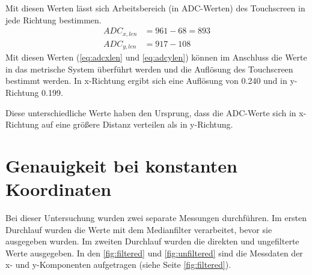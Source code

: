 Mit diesen Werten lässt sich Arbeitsbereich (in ADC-Werten) des Touchscreen in jede Richtung bestimmen.
\begin{align}
    ADC_{x,len} &= 961 - 68 = 893
    \label{eq:adcxlen}\\
    ADC_{y,len} &= 917 - 108
    \label{eq:adcylen}
\end{align}
Mit diesen Werten (\cref{eq:adcxlen} und \cref{eq:adcylen}) können im Anschluss die Werte in das metrische System überführt werden und die Auflösung des Touchscreen bestimmt werden.
In x-Richtung ergibt sich eine Auflösung von \SI{0,240}{} und in y-Richtung \SI{0,199}{}.

Diese unterschiedliche Werte haben den Ursprung, dass die ADC-Werte sich in x-Richtung auf eine größere Distanz verteilen als in y-Richtung.

\section{Genauigkeit bei konstanten Koordinaten}
\label{ab:genau}
Bei dieser Untersuchung wurden zwei separate Messungen durchführen.
Im ersten Durchlauf wurden die Werte mit dem Medianfilter verarbeitet, bevor sie ausgegeben wurden.
Im zweiten Durchlauf wurden die direkten und ungefilterte Werte ausgegeben.
In den \cref{fig:filtered} und \cref{fig:unfiltered} sind die Messdaten der x- und y-Komponenten aufgetragen (siehe Seite \cref{fig:filtered}).

